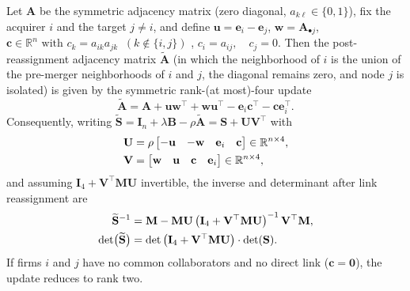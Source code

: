 \begin{lemma}
Let $\mathbf{A}$ be the symmetric adjacency matrix (zero diagonal,
$a_{k\ell} \in \{0,1\}$), fix the acquirer $i$ and the target $j \neq
i$, and define
$
\mathbf{u} = \mathbf{e}_i - \mathbf{e}_j$, 
$
\mathbf{w} = \mathbf{A}_{\bullet j}$, 
$
\mathbf{c} \in \mathbb{R}^n
\text{ with }
c_k = a_{ik} a_{jk} \;\; (k \notin \{i,j\})$ ,
$
c_i = a_{ij},
\quad
c_j = 0$. 
Then the post-reassignment adjacency matrix
$\widetilde{\mathbf{A}}$ (in which the neighborhood of $i$ is the
union of the pre-merger neighborhoods of $i$ and $j$, the diagonal
remains zero, and node $j$ is isolated) is given by the symmetric
rank-(at most)-four update
\begin{equation}
\widetilde{\mathbf{A}}
=
\mathbf{A}
+ \mathbf{u} \mathbf{w}^\top + \mathbf{w} \mathbf{u}^\top
- \mathbf{e}_i \mathbf{c}^\top - \mathbf{c} \mathbf{e}_i^\top.
\label{eq:merger-adjacency}
\end{equation}
Consequently, writing $\widetilde{\mathbf{S}} = \mathbf{I}_n + \lambda
\mathbf{B} - \rho \widetilde{\mathbf{A}} = \mathbf{S} + \mathbf{U}
\mathbf{V}^\top$ with
\begin{align*}
\mathbf{U}
& =
\rho
\begin{bmatrix}
-\mathbf{u} & -\mathbf{w} & \mathbf{e}_i & \mathbf{c}
\end{bmatrix}
\in \mathbb{R}^{n \times 4},
\notag \\
\mathbf{V}
& =
\begin{bmatrix}
\mathbf{w} & \mathbf{u} & \mathbf{c} & \mathbf{e}_i
\end{bmatrix}
\in \mathbb{R}^{n \times 4},
\end{align*}
and assuming $\mathbf{I}_4 + \mathbf{V}^\top \mathbf{M} \mathbf{U}$
invertible, the inverse and determinant after link reassignment are
\begin{align}
\widetilde{\mathbf{S}}^{-1}
& =
\mathbf{M}
- \mathbf{M} \mathbf{U}
\left( \mathbf{I}_4 + \mathbf{V}^\top \mathbf{M} \mathbf{U} \right)^{-1}
\mathbf{V}^\top \mathbf{M},
\notag \\
\det \bigl( \widetilde{\mathbf{S}} \bigr)
& =
\det \left( \mathbf{I}_4 + \mathbf{V}^\top \mathbf{M} \mathbf{U} \right)
\cdot \det ( \mathbf{S} ).
\label{eq:merger-update}
\end{align}
If firms $i$ and $j$ have no common collaborators and no direct link
($\mathbf{c} = \mathbf{0}$), the update reduces to rank two.
\label{lem:matrix-perturbation-mult-swap}
\end{lemma}

